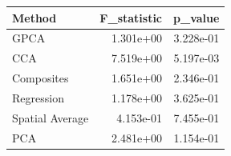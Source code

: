\begin{tabular}{lrr}
\toprule
Method & F_statistic & p_value \\
\midrule
GPCA & 1.301e+00 & 3.228e-01 \\
CCA & 7.519e+00 & 5.197e-03 \\
Composites & 1.651e+00 & 2.346e-01 \\
Regression & 1.178e+00 & 3.625e-01 \\
Spatial Average & 4.153e-01 & 7.455e-01 \\
PCA & 2.481e+00 & 1.154e-01 \\
\bottomrule
\end{tabular}
